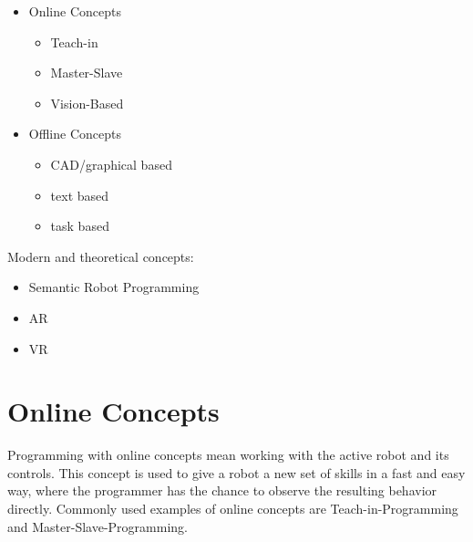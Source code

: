 \documentclass[conference]{IEEEtran}
\begin{document}
 \begin{itemize}
    \item Online Concepts
        \begin{itemize}
            \item Teach-in
            \item Master-Slave
            \item Vision-Based
        \end{itemize}
    \item Offline Concepts
        \begin{itemize}
            \item CAD/graphical based
            \item text based
            \item task based
        \end{itemize}
 \end{itemize}

Modern and theoretical concepts:

\begin{itemize}
    \item Semantic Robot Programming
    \item AR
    \item VR
\end{itemize}

\section{Online Concepts}

Programming with online concepts mean working with the active robot and its controls. \cite[p. 186]{b4} %
This concept is used to give a robot a new set of skills in a fast and easy way, where the programmer has the chance to observe the resulting behavior directly.
Commonly used examples of online concepts are Teach-in-Programming and Master-Slave-Programming. \cite[p. 187]{b4}%

\end{document}
